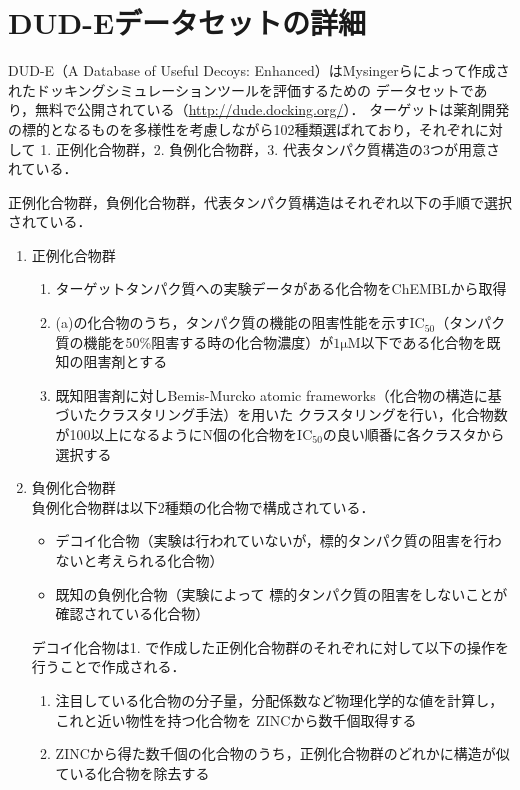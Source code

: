 \appendix
\chapter{DUD-Eデータセットの詳細}\label{appendix:dude}
DUD-E（A Database of Useful Decoys: Enhanced）はMysingerらによって作成されたドッキングシミュレーションツールを評価するための
データセットであり\cite{Mysinger2012}，無料で公開されている（\url{http://dude.docking.org/}）．
ターゲットは薬剤開発の標的となるものを多様性を考慮しながら102種類選ばれており，それぞれに対して
1. 正例化合物群，2. 負例化合物群，3. 代表タンパク質構造の3つが用意されている．

正例化合物群，負例化合物群，代表タンパク質構造はそれぞれ以下の手順で選択されている．
\begin{enumerate}
\item 正例化合物群
	\begin{enumerate}
	\item ターゲットタンパク質への実験データがある化合物をChEMBL\cite{Gaulton2012}から取得
	\item (a)の化合物のうち，タンパク質の機能の阻害性能を示す$\mathrm{IC_{50}}$（タンパク質の機能を50\%阻害する時の化合物濃度）が$\mathrm{1\mu M}$以下である化合物を既知の阻害剤とする
	\item 既知阻害剤に対しBemis-Murcko atomic frameworks（化合物の構造に基づいたクラスタリング手法\cite{Bemis1996}）を用いた
		クラスタリングを行い，化合物数が100以上になるようにN個の化合物を$\mathrm{IC_{50}}$の良い順番に各クラスタから選択する
	\end{enumerate}
\item 負例化合物群\\
	負例化合物群は以下2種類の化合物で構成されている．
	\begin{itemize}
	\item デコイ化合物（実験は行われていないが，標的タンパク質の阻害を行わないと考えられる化合物）
	\item 既知の負例化合物（実験によって	標的タンパク質の阻害をしないことが確認されている化合物）
	\end{itemize}
	デコイ化合物は1. で作成した正例化合物群のそれぞれに対して以下の操作を行うことで作成される．
	\begin{enumerate}
	\item 注目している化合物の分子量，分配係数など物理化学的な値を計算し，これと近い物性を持つ化合物を
		ZINC\cite{Irwin2005}から数千個取得する
	\item ZINCから得た数千個の化合物のうち，正例化合物群のどれかに構造が似ている化合物を除去する

\end{enumerate}
\end{enumerate}
